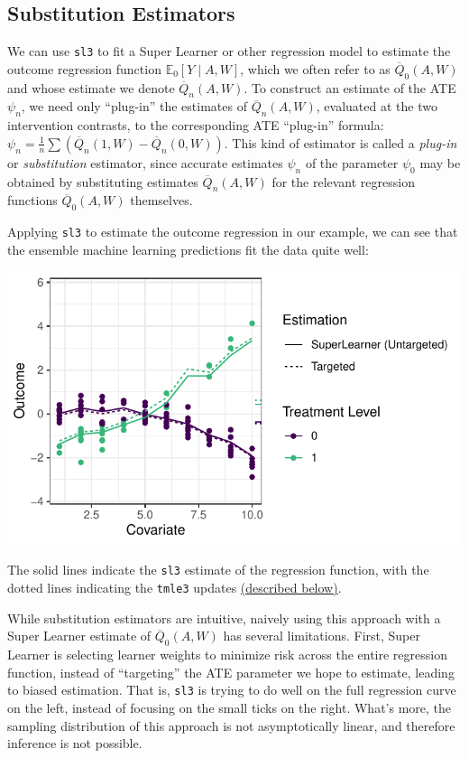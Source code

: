 \documentclass[12pt, krantz2,]{krantz}
\theoremstyle{definition}
\theoremstyle{definition}
\theoremstyle{definition}
\newcommand{\1}{\mathbbm{1}}
\begin{document}
\hypertarget{substitution-est}{%
\subsection{Substitution Estimators}\label{substitution-est}}

We can use \texttt{sl3} to fit a Super Learner or other regression model to estimate
the outcome regression function \(\mathbb{E}_0[Y \mid A,W]\), which we often refer
to as \(\overline{Q}_0(A,W)\) and whose estimate we denote \(\overline{Q}_n(A,W)\).
To construct an estimate of the ATE \(\psi_n\), we need only ``plug-in'' the
estimates of \(\overline{Q}_n(A,W)\), evaluated at the two intervention contrasts,
to the corresponding ATE ``plug-in'' formula:
\(\psi_n = \frac{1}{n}\sum(\overline{Q}_n(1,W)-\overline{Q}_n(0,W))\). This kind
of estimator is called a \emph{plug-in} or \emph{substitution} estimator, since accurate
estimates \(\psi_n\) of the parameter \(\psi_0\) may be obtained by substituting
estimates \(\overline{Q}_n(A,W)\) for the relevant regression functions
\(\overline{Q}_0(A,W)\) themselves.

Applying \texttt{sl3} to estimate the outcome regression in our example, we can see
that the ensemble machine learning predictions fit the data quite well:

\begin{center}\includegraphics[width=0.8\linewidth]{img/misc/tmle_sim/schematic_2b_sllik} \end{center}

The solid lines indicate the \texttt{sl3} estimate of the regression function, with the
dotted lines indicating the \texttt{tmle3} updates \protect\hyperlink{tmle-updates}{(described below)}.

While substitution estimators are intuitive, naively using this approach with a
Super Learner estimate of \(\overline{Q}_0(A,W)\) has several limitations. First,
Super Learner is selecting learner weights to minimize risk across the entire
regression function, instead of ``targeting'' the ATE parameter we hope to
estimate, leading to biased estimation. That is, \texttt{sl3} is trying to do well on
the full regression curve on the left, instead of focusing on the small ticks on
the right. What's more, the sampling distribution of this approach is not
asymptotically linear, and therefore inference is not possible.
\end{document}
